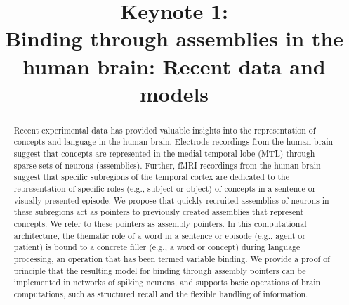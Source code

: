 \documentclass{article}
\title{Keynote 1:\\Binding through assemblies in the human brain: Recent data and models}
\begin{document}
\maketitle
\thispagestyle{empty}
\begin{abstract}
Recent experimental data has provided valuable insights into the representation of concepts and language in the human brain. Electrode recordings from the human brain suggest that concepts are represented in the medial temporal lobe (MTL) through sparse sets of neurons (assemblies). Further, fMRI recordings from the human brain suggest that specific subregions of the temporal cortex are dedicated to the representation of specific roles (e.g., subject or object) of concepts in a sentence or visually presented episode. We propose that quickly recruited assemblies of neurons in these subregions act as pointers  to previously created assemblies that represent concepts. We refer to these pointers as assembly pointers. In this computational architecture, the thematic role of a word in a sentence or episode (e.g., agent or patient) is bound to a concrete filler (e.g., a word or concept) during language processing, an operation that has been termed variable binding. We provide a proof of principle that the resulting model for binding through assembly pointers can be implemented in networks of spiking neurons, and supports basic operations of brain computations, such as structured recall and the flexible handling of information.
\end{abstract}
\vfill{}
\end{document}
